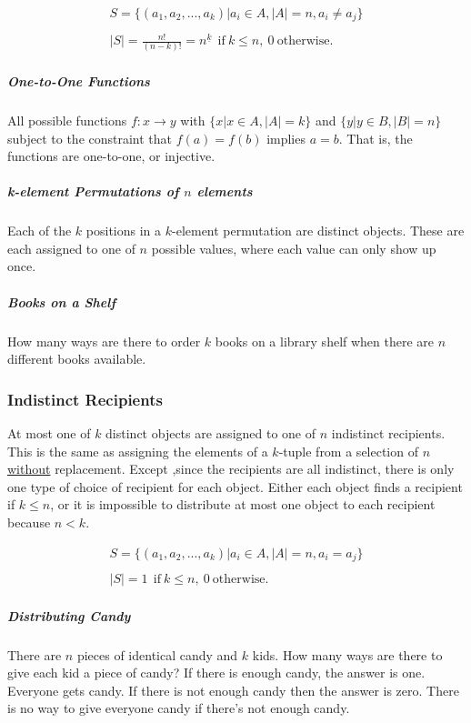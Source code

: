 \begin{equation}	
\begin{array}{l}
S = \{ (a_1,a_2,...,a_k) | a_i \in A, |A| = n, a_i\neq a_j\}\\
\\
|S| = \frac{n!}{(n-k)!} = n^{\underline{k}}\ \ \mathrm{if\ }k\leq n,\ 0\ \mathrm{otherwise.}
\end{array}
\end{equation}

\subparagraph{One-to-One Functions} All possible functions $f:x \rightarrow y$ with $\{x | x\in A, |A| = k \}$ and $\{y | y\in B, |B| = n\}$ subject to the constraint that $f(a) = f(b)$ implies $a=b$. That is, the functions are one-to-one, or injective.

\subparagraph{k-element Permutations of $n$ elements}  Each of the $k$ positions in a $k$-element permutation are distinct objects. These are each assigned to one of $n$ possible values, where each value can only show up once. 

\subparagraph{Books on a Shelf} How many ways are there to order $k$ books on a library shelf when there are $n$ different books available. 

\subsubsection{Indistinct Recipients}
At most one of $k$ distinct objects are assigned to one of $n$ indistinct recipients. This is the same as assigning the elements of a $k$-tuple from a selection of $n$ \underline{without} replacement. Except ,since the recipients are all indistinct, there is only one type of choice of recipient for each object. Either each object finds a recipient if $k\leq n$, or it is impossible to distribute at most one object to each recipient because $n < k$.

\begin{equation}
\begin{array}{l}
S = \{ (a_1,a_2,...,a_k) | a_i \in A, |A| = n, a_i=a_j\}\\
\\
|S| = 1\ \ \mathrm{if\ }k\leq n,\ 0\ \mathrm{otherwise.}
\end{array}
\end{equation}

\subparagraph{Distributing Candy} There are $n$ pieces of identical candy and $k$ kids. How many ways are there to give each kid a piece of candy? If there is enough candy, the answer is one. Everyone gets candy. If there is not enough candy then the answer is zero. There is no way to give everyone candy if there's not enough candy.

